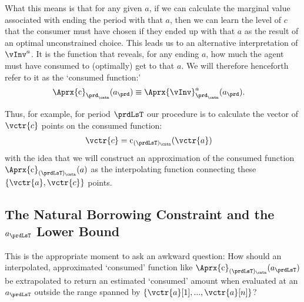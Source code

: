 \documentclass[titlepage, headings=optiontotocandhead]{econtex}
\begin{document}
What this means is that for any given $a$, if we can calculate the marginal value associated with ending the period with that $a$, then we can learn the level of $c$ that the consumer must have chosen if they ended up with that $a$ as the result of an optimal unconstrained choice.  This leads us to an alternative interpretation of $\vInv^{a}$. It is the function that reveals, for any ending $a$, how much the agent must have consumed to (optimally) get to that $a$.  We will therefore henceforth refer to it as the `consumed function:'
\begin{equation}\begin{gathered}\begin{aligned}
      \Aprx{\mathrm{c}}_{\prd_\cntn}(a_{\prd}) & \equiv \Aprx{\vInv}^{a}_{\prd_\cntn}(a_{\prd}) \label{eq:consumedfn}.    
    \end{aligned}\end{gathered}\end{equation}

Thus, for example, for period $\prdLsT$ our procedure is to calculate the vector of $\vctr{c}$ points on the consumed function:
\begin{equation}\begin{gathered}\begin{aligned}
      \vctr{c} & = \mathrm{c}_{(\prdLsT)_\cntn}(\vctr{a}) \label{eq:consumedfnvecs}     
    \end{aligned}\end{gathered}\end{equation}
with the idea that we will construct an approximation of the consumed function $\Aprx{\mathrm{c}}_{(\prdLsT)_\cntn}(a)$ as the interpolating function connecting these $\{\vctr{a},\vctr{c}\}$ points.

\hypertarget{the-natural-borrowing-constraint-and-the-a-lower-bound}{}
\subsection{The Natural Borrowing Constraint and the $a_{\prdLsT}$ Lower Bound} \label{subsec:LiqConstrSelfImposed}

This is the appropriate moment to ask an awkward question: How should an interpolated, approximated `consumed' function like $\Aprx{\mathrm{c}}_{(\prdLsT)_\cntn}(a_{\prdLsT})$ be extrapolated to return an estimated `consumed' amount when evaluated at an $a_{\prdLsT}$ outside the range spanned by $\{\vctr{a}[1],...,\vctr{a}[n]\}$?
\end{document}
